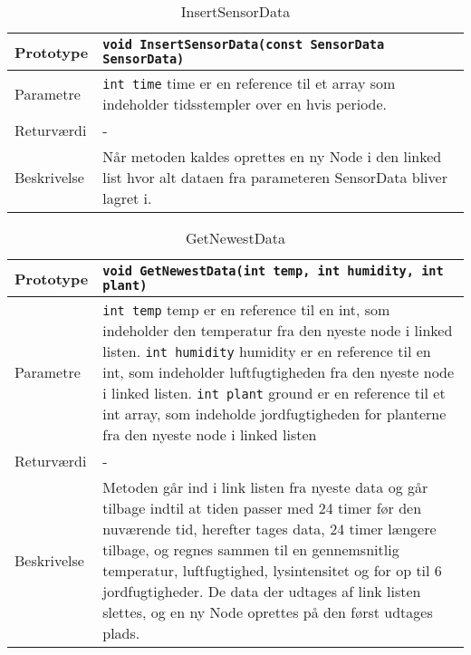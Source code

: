 \begin{table}[h]
\begin{tabularx}{\textwidth}{| >{\raggedright\arraybackslash}p{2.5 cm} | >{\raggedright\arraybackslash}X |} \hline
Prototype & \texttt{void InsertSensorData(const SensorData SensorData)} \\\hline
Parametre & \texttt{int time} \newline 
time er en reference til et array som indeholder tidsstempler over en hvis periode. \\\hline
Returværdi & - \\\hline
Beskrivelse & Når metoden kaldes oprettes en ny Node i den linked list hvor alt dataen fra parameteren SensorData bliver lagret i. \\\hline
\end{tabularx}
\caption{InsertSensorData}
\label{table:InsertSensorData}
\end{table}

\begin{table}[h]
\begin{tabularx}{\textwidth}{| >{\raggedright\arraybackslash}p{2.5 cm} | >{\raggedright\arraybackslash}X |} \hline
Prototype & \texttt{void GetNewestData(int temp, int humidity, int plant)} \\\hline
Parametre & \texttt{int temp} \newline 
temp er en reference til en int, som indeholder den temperatur fra den nyeste node i linked listen. \newline
\texttt{int humidity} \newline
humidity er en reference til en int, som indeholder luftfugtigheden fra den nyeste node i linked listen. \newline
\texttt{int plant} \newline
ground er en reference til et int array, som indeholde jordfugtigheden for planterne fra den nyeste node i linked listen \\\hline
Returværdi & - \\\hline
Beskrivelse & Metoden går ind i link listen fra nyeste data og går tilbage indtil at tiden passer med 24 timer før den nuværende tid, herefter tages data, 24 timer længere tilbage, og regnes sammen til en gennemsnitlig temperatur, luftfugtighed, lysintensitet og for op til 6 jordfugtigheder. De data der udtages af link listen slettes, og en ny Node oprettes på den først udtages plads. \\\hline
\end{tabularx}
\caption{GetNewestData}
\label{table:GetNewestData}
\end{table}


